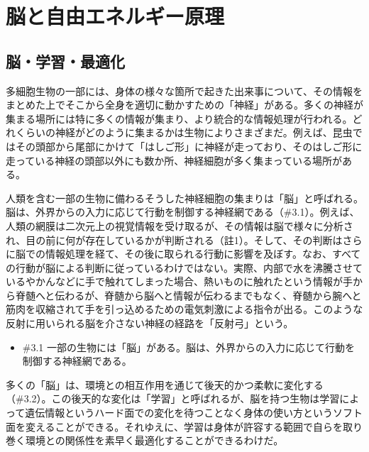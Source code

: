 \section{脳と自由エネルギー原理}\label{ux8133ux3068ux81eaux7531ux30a8ux30cdux30ebux30aeux30fcux539fux7406}

\subsection{脳・学習・最適化}\label{ux8133ux5b66ux7fd2ux6700ux9069ux5316}

多細胞生物の一部には、身体の様々な箇所で起きた出来事について、その情報をまとめた上でそこから全身を適切に動かすための「神経」がある。多くの神経が集まる場所には特に多くの情報が集まり、より統合的な情報処理が行われる。どれくらいの神経がどのように集まるかは生物によりさまざまだ。例えば、昆虫ではその頭部から尾部にかけて「はしご形」に神経が走っており、そのはしご形に走っている神経の頭部以外にも数か所、神経細胞が多く集まっている場所がある。

人類を含む一部の生物に備わるそうした神経細胞の集まりは「脳」と呼ばれる。脳は、外界からの入力に応じて行動を制御する神経網である（\#3.1）。例えば、人類の網膜は二次元上の視覚情報を受け取るが、その情報は脳で様々に分析され、目の前に何が存在しているかが判断される（註1）。そして、その判断はさらに脳での情報処理を経て、その後に取られる行動に影響を及ぼす。なお、すべての行動が脳による判断に従っているわけではない。実際、内部で水を沸騰させているやかんなどに手で触れてしまった場合、熱いものに触れたという情報が手から脊髄へと伝わるが、脊髄から脳へと情報が伝わるまでもなく、脊髄から腕へと筋肉を収縮されて手を引っ込めるための電気刺激による指令が出る。このような反射に用いられる脳を介さない神経の経路を「反射弓」という。

\begin{note}{}
  \begin{itemize}
    \tightlist
    \item{\#3.1}
      一部の生物には「脳」がある。脳は、外界からの入力に応じて行動を制御する神経網である。
  \end{itemize}
\end{note}

多くの「脳」は、環境との相互作用を通じて後天的かつ柔軟に変化する（\#3.2）。この後天的な変化は「学習」と呼ばれるが、脳を持つ生物は学習によって遺伝情報というハード面での変化を待つことなく身体の使い方というソフト面を変えることができる。それゆえに、学習は身体が許容する範囲で自らを取り巻く環境との関係性を素早く最適化することができるわけだ。

